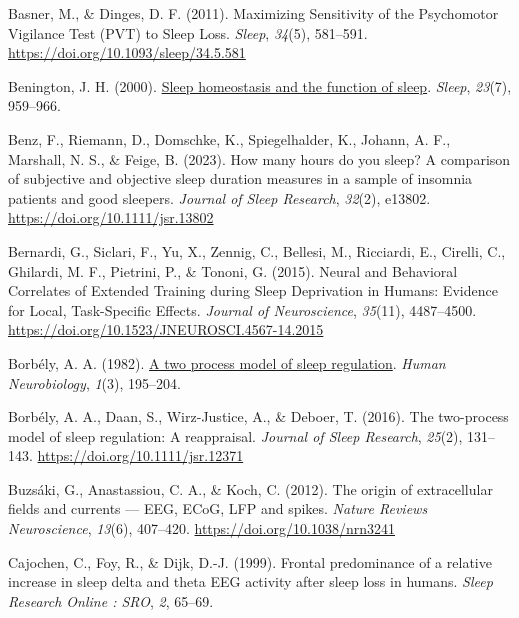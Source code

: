 \documentclass[
]{article}
\newlength{\cslhangindent}
\newenvironment{CSLReferences}[2] %
 {\begin{list}{}{%
  \setlength{\itemindent}{0pt}
  \setlength{\leftmargin}{0pt}
  \setlength{\parsep}{0pt}
  \ifodd #1
   \setlength{\leftmargin}{\cslhangindent}
   \setlength{\itemindent}{-1\cslhangindent}
  \fi
  \setlength{\itemsep}{#2\baselineskip}}}
 {\end{list}}
\begin{document}
\begin{CSLReferences}{1}{0}
Basner, M., \& Dinges, D. F. (2011). Maximizing {Sensitivity} of the
{Psychomotor Vigilance Test} ({PVT}) to {Sleep Loss}. \emph{Sleep},
\emph{34}(5), 581--591. \url{https://doi.org/10.1093/sleep/34.5.581}

Benington, J. H. (2000).
\href{https://www.ncbi.nlm.nih.gov/pubmed/11083605}{Sleep homeostasis
and the function of sleep}. \emph{Sleep}, \emph{23}(7), 959--966.

Benz, F., Riemann, D., Domschke, K., Spiegelhalder, K., Johann, A. F.,
Marshall, N. S., \& Feige, B. (2023). How many hours do you sleep? {A}
comparison of subjective and objective sleep duration measures in a
sample of insomnia patients and good sleepers. \emph{Journal of Sleep
Research}, \emph{32}(2), e13802. \url{https://doi.org/10.1111/jsr.13802}

Bernardi, G., Siclari, F., Yu, X., Zennig, C., Bellesi, M., Ricciardi,
E., Cirelli, C., Ghilardi, M. F., Pietrini, P., \& Tononi, G. (2015).
Neural and {Behavioral Correlates} of {Extended Training} during {Sleep
Deprivation} in {Humans}: {Evidence} for {Local}, {Task-Specific
Effects}. \emph{Journal of Neuroscience}, \emph{35}(11), 4487--4500.
\url{https://doi.org/10.1523/JNEUROSCI.4567-14.2015}

Borbély, A. A. (1982).
\href{https://www.ncbi.nlm.nih.gov/pubmed/7185792}{A two process model
of sleep regulation}. \emph{Human Neurobiology}, \emph{1}(3), 195--204.

Borbély, A. A., Daan, S., Wirz-Justice, A., \& Deboer, T. (2016). The
two-process model of sleep regulation: A reappraisal. \emph{Journal of
Sleep Research}, \emph{25}(2), 131--143.
\url{https://doi.org/10.1111/jsr.12371}

Buzsáki, G., Anastassiou, C. A., \& Koch, C. (2012). The origin of
extracellular fields and currents --- {EEG}, {ECoG}, {LFP} and spikes.
\emph{Nature Reviews Neuroscience}, \emph{13}(6), 407--420.
\url{https://doi.org/10.1038/nrn3241}

Cajochen, C., Foy, R., \& Dijk, D.-J. (1999). Frontal predominance of a
relative increase in sleep delta and theta {EEG} activity after sleep
loss in humans. \emph{Sleep Research Online : SRO}, \emph{2}, 65--69.


\end{CSLReferences}
\end{document}
